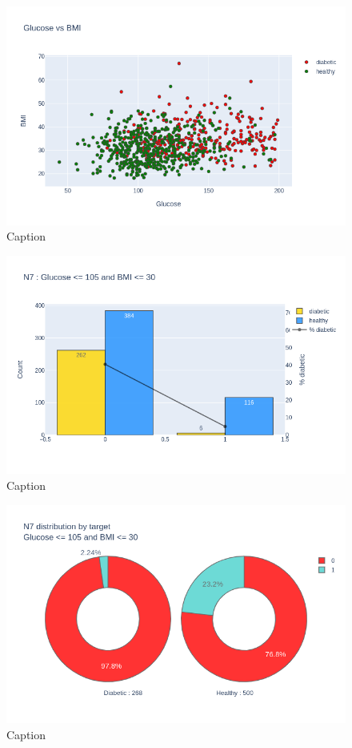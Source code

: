 \documentclass[12pt]{article}
\begin{document}
\begin{figure}[ht]
\centering
\includegraphics[width=1\textwidth]{newplot(28).png}
\caption{\label{fig:38} Caption}
\end{figure}

\begin{figure}[ht]
\centering
\includegraphics[width=1\textwidth]{newplot(29).png}
\caption{\label{fig:39} Caption}
\end{figure}

\begin{figure}[ht]
\centering
\includegraphics[width=1\textwidth]{newplot(30).png}
\caption{\label{fig:40} Caption}
\end{figure}
\end{document}
